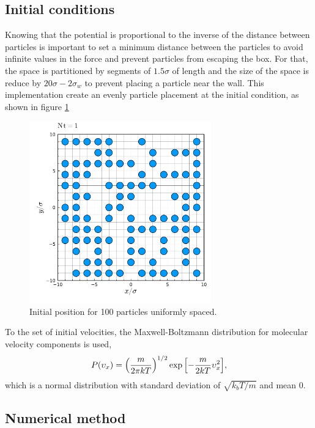 \documentclass[main.tex]{subfiles}
\begin{document}
\subsection{Initial conditions}

Knowing that the potential is proportional to the inverse of the distance between particles is important to set a minimum distance between the particles to avoid infinite values in the force and prevent particles from escaping the box.
For that, the space is partitioned by segments of $1.5\sigma$ of length and the size of the space is reduce by $20\sigma-2\sigma_{w}$ to prevent placing a particle near the wall.
This implementation create an evenly particle placement at the initial condition, as shown in figure \ref{fig:InPos100part}

\begin{figure}[ht!]
    \centering
    \includegraphics[width=0.7\textwidth]{imgs/hw1/100IniPos.pdf}
    \caption{Initial position for 100 particles uniformly spaced.}
    \label{fig:InPos100part}
\end{figure}

To the set of initial velocities, the Maxwell-Boltzmann distribution for molecular velocity components is used,
\begin{gather}
    P\qty(\upsilon_{x}) = \qty(\frac{m}{2\pi kT})^{1/2}\exp\qty[-\frac{m}{2kT}\upsilon_{x}^{2}],
\end{gather}
which is a normal distribution with standard deviation of $\sqrt{k_{b}T/m}$ and mean $0$.

\subsection{Numerical method}
\end{document}
